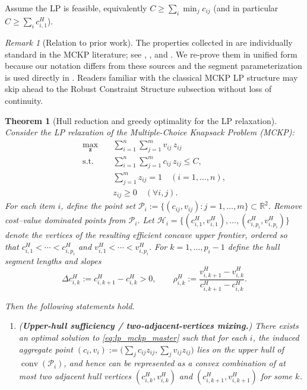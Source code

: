 \documentclass[11pt, a4paper]{article}
\theoremstyle{plain}
\newtheorem{theorem}{Theorem}
\theoremstyle{definition}
\theoremstyle{remark}
\newtheorem{remark}[remark]{Remark}
\begin{document}
Assume the LP is feasible, equivalently $C \ge \sum_i \min_j c_{ij}$ (and in particular $C \ge \sum_i c^H_{i,1}$).
\begin{remark}[Relation to prior work]\label{rem:prior_hull}
The properties collected in  are individually standard in the MCKP literature; see \citet{Dyer1984}, \citet{Pisinger1995}, and \citet[Chapter~11]{Kellerer2004}. We re-prove them in unified form because our notation differs from these sources and the segment parameterization is used directly in . Readers familiar with the classical MCKP LP structure may skip ahead to the Robust Constraint Structure subsection without loss of continuity.
\end{remark}
\begin{theorem}[Hull reduction and greedy optimality for the LP relaxation]\label{thm:master_greedy}
Consider the LP relaxation of the Multiple-Choice Knapsack Problem (MCKP):
\begin{align}\label{eq:lp_mckp_master}
\max_{\bm{z}} \quad & \sum_{i=1}^n\sum_{j=1}^m v_{ij}\,z_{ij}\\
\text{s.t.}\quad & \sum_{i=1}^n\sum_{j=1}^m c_{ij}\,z_{ij}\le C,\nonumber\\
& \sum_{j=1}^m z_{ij}=1 \quad (i=1,\dots,n),\nonumber\\
& z_{ij}\ge 0 \quad (\forall i,j).\nonumber
\end{align}
For each item $i$, define the point set $\mathcal P_i:=\{(c_{ij},v_{ij}) : j=1,\dots,m\}\subset\mathbb R^2$.
Remove cost--value dominated points from $\mathcal P_i$.  Let $\mathcal H_i=\{(c^H_{i,1},v^H_{i,1}),\allowbreak\dots,\allowbreak(c^H_{i,p_i},v^H_{i,p_i})\}$ denote the vertices of the resulting efficient concave upper frontier, ordered so that $c^H_{i,1}<\cdots<c^H_{i,p_i}$ and $v^H_{i,1}<\cdots<v^H_{i,p_i}$.
For $k=1,\dots,p_i-1$ define the hull segment lengths and slopes
\[
\Delta c^H_{i,k}:=c^H_{i,k+1}-c^H_{i,k}>0,
\qquad
\rho^H_{i,k}:=\frac{v^H_{i,k+1}-v^H_{i,k}}{c^H_{i,k+1}-c^H_{i,k}}.
\]

Then the following statements hold.

\begin{enumerate}
\item[(i)] (\textbf{Upper-hull sufficiency / two-adjacent-vertices mixing.})
There exists an optimal solution to \eqref{eq:lp_mckp_master} such that for each $i$,
the induced aggregate point $(c_i,v_i):=\big(\sum_j c_{ij}z_{ij},\sum_j v_{ij}z_{ij}\big)$ lies on the upper hull of
$\operatorname{conv}(\mathcal P_i)$, and hence can be represented as a convex combination of at most two \emph{adjacent} hull vertices
$(c^H_{i,k},v^H_{i,k})$ and $(c^H_{i,k+1},v^H_{i,k+1})$ for some $k$.


\end{enumerate}
\end{theorem}
\end{document}
